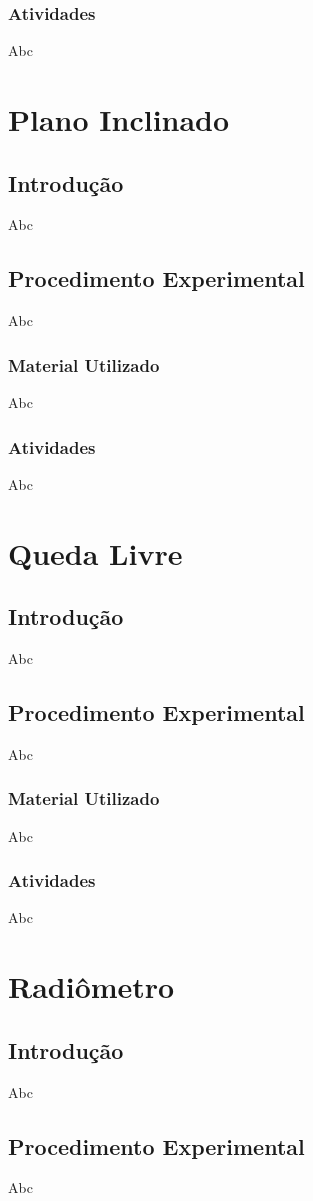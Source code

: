 \documentclass[12pt,a4paper]{article}
\begin{document}
		\subsubsection{Atividades}
		Abc
	\section{Plano Inclinado}
		\subsection{Introdução}
		Abc
		\subsection{Procedimento Experimental}
		Abc
		\subsubsection{Material Utilizado}
		Abc
		\subsubsection{Atividades}
		Abc
	\section{Queda Livre}
		\subsection{Introdução}
		Abc
		\subsection{Procedimento Experimental}
		Abc
		\subsubsection{Material Utilizado}
		Abc
		\subsubsection{Atividades}
		Abc
	\section{Radiômetro}
		\subsection{Introdução}
		Abc
		\subsection{Procedimento Experimental}
		Abc
\end{document}
